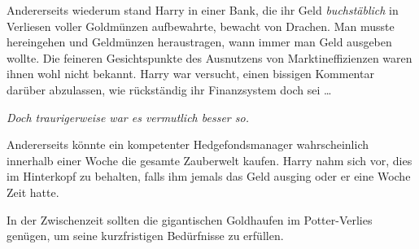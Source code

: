 Andererseits wiederum stand Harry in einer Bank, die ihr Geld \emph{buchstäblich} in Verliesen voller Goldmünzen aufbewahrte, bewacht von Drachen. Man musste hereingehen und Geldmünzen heraustragen, wann immer man Geld ausgeben wollte. Die feineren Gesichtspunkte des Ausnutzens von Marktineffizienzen waren ihnen wohl nicht bekannt. Harry war versucht, einen bissigen Kommentar darüber abzulassen, wie rückständig ihr Finanzsystem doch sei …

\emph{Doch traurigerweise war es vermutlich besser so.}

Andererseits könnte ein kompetenter Hedgefondsmanager wahrscheinlich innerhalb einer Woche die gesamte Zauberwelt kaufen. Harry nahm sich vor, dies im Hinterkopf zu behalten, falls ihm jemals das Geld ausging oder er eine Woche Zeit hatte.

In der Zwischenzeit sollten die gigantischen Goldhaufen im Potter-Verlies genügen, um seine kurzfristigen Bedürfnisse zu erfüllen.

